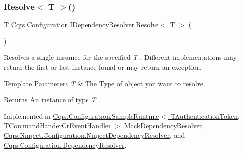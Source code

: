 \mbox{\label{interfaceCqrs_1_1Configuration_1_1IDependencyResolver_a9dc7694a365209a5ef05270a7cfa7b6b_a9dc7694a365209a5ef05270a7cfa7b6b}} 
\subsubsection{\texorpdfstring{Resolve$<$ T $>$()}{Resolve< T >()}}
{\footnotesize\ttfamily T \hyperlink{interfaceCqrs_1_1Configuration_1_1IDependencyResolver_aa455096b7b94fc1d64904bc67830ec06_aa455096b7b94fc1d64904bc67830ec06}{Cqrs.\+Configuration.\+I\+Dependency\+Resolver.\+Resolve}$<$ T $>$ (\begin{DoxyParamCaption}{ }\end{DoxyParamCaption})}



Resolves a single instance for the specified {\itshape T} . Different implementations may return the first or last instance found or may return an exception. 


\begin{DoxyTemplParams}{Template Parameters}
{\em T} & The Type of object you want to resolve.\\
\hline
\end{DoxyTemplParams}
\begin{DoxyReturn}{Returns}
An instance of type {\itshape T} .
\end{DoxyReturn}


Implemented in \hyperlink{classCqrs_1_1Configuration_1_1SampleRuntime_1_1MockDependencyResolver_a8f91ae00213bf65aa3349a7dcd82d24d_a8f91ae00213bf65aa3349a7dcd82d24d}{Cqrs.\+Configuration.\+Sample\+Runtime$<$ T\+Authentication\+Token, T\+Command\+Hander\+Or\+Event\+Handler $>$.\+Mock\+Dependency\+Resolver}, \hyperlink{classCqrs_1_1Ninject_1_1Configuration_1_1NinjectDependencyResolver_ab044ba98051bdd3111e0c1be6259de10_ab044ba98051bdd3111e0c1be6259de10}{Cqrs.\+Ninject.\+Configuration.\+Ninject\+Dependency\+Resolver}, and \hyperlink{classCqrs_1_1Configuration_1_1DependencyResolver_a1eb177fc6c914b45d138642fb6d9454d_a1eb177fc6c914b45d138642fb6d9454d}{Cqrs.\+Configuration.\+Dependency\+Resolver}.

